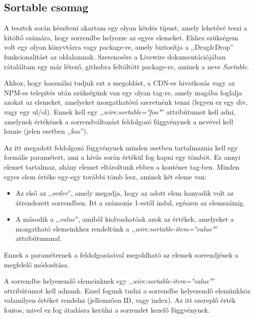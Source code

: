\documentclass[
]{thesis-ekf}
\theoremstyle{definition}
\theoremstyle{remark}
\begin{document}
                \subsection{Sortable csomag}
                A tesztek során készíteni akartam egy olyan kérdés típust, amely lehetővé teszi a kitöltő számára, hogy sorrendbe helyezze az egyes elemeket. Ehhez szükségem volt egy olyan könyvtárra vagy package-re, amely biztosítja a ,,Drag\&Drop'' funkcionalitást az oldalamnak. Szerencsére a Livewire dokumentációjában\cite{Livewire-SortableDoc} rátaláltam egy már létező, githubra feltöltött package-re\cite{Livewire-SortableGitHub}, aminek a neve \emph{Sortable}.

                Ahhoz, hogy használni tudjuk ezt a megoldást, a CDN-es hivatkozás vagy az NPM-es telepítés után szükségünk van egy olyan tag-re, amely magába foglalja azokat az elemeket, amelyeket mozgathatóvá szeretnénk tenni (legyen ez egy div, vagy egy ul/ol). Ennek kell egy ,,\emph{wire:sortable="foo"}'' attribútumot kell adni, amelynek értékének a sorrendváltozást feldolgozó függvénynek a nevével kell lennie (jelen esetben ,,foo'').

                Az itt megadott feldolgozó függvénynek minden esetben tartalmaznia kell egy formális paramétert, ami a hívás során értékül fog kapni egy tömböt. Ez annyi elemet tartalmaz, ahány elemet eltároltunk ebben a konténer tag-ben. Minden egyes elem értéke egy-egy további tömb lesz, aminek két eleme van:
                \begin{itemize}
                    \item Az első az ,,\emph{order}'', amely megadja, hogy az adott elem hanyadik volt az átrendezett sorrendben. Itt a számozás 1-estől indul, egészen az elemszámig.
                    \item A második a ,,\emph{value}'', amiből kiolvashatóak azok az értékek, amelyeket a mozgatható elemeinkhez rendeltünk a ,,\emph{wire:sortable-item="value"}'' attribútummal.
                \end{itemize}
                Ennek a paraméternek a feldolgozásával megoldható az elemek sorrendjének a megfelelő módosítása.
                
                A sorrendbe helyezendő elemeinknek egy ,,\emph{wire:sortable-item="value"}'' attribútumot kell adnunk. Ezzel fogunk tudni a sorrendbe helyezendő elemünkhöz valamilyen értéket rendelni (jellemzően ID, vagy index). Az itt szereplő érték fontos, mivel ez fog átadásra kerülni a sorrendet kezelő függvénynek.
\end{document}
